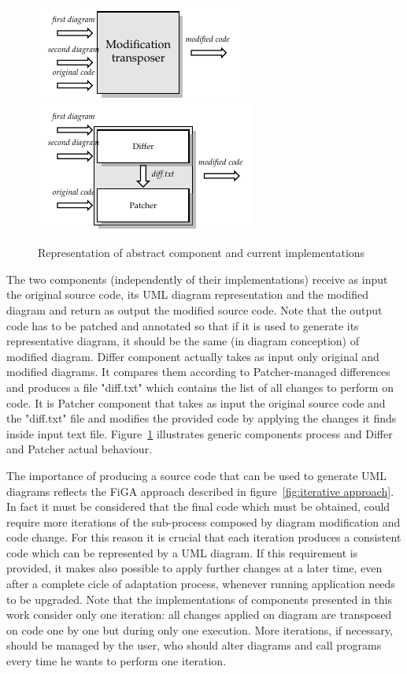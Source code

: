 \begin{figure}[htbp]
   \centering
   \includegraphics{sample/figs/abstractComp.pdf}
   \hspace{1.5cm}
   \includegraphics{sample/figs/concreteComp.pdf}
   \vspace*{5pt}
   \caption{Representation of abstract component and current implementations}\label{generic components i/o}
\end{figure}

The two components (independently of their implementations) receive as input the original source code, its UML diagram representation and the modified diagram and return as output the modified source code. Note that the output code has to be patched and annotated so that if it is used to generate its representative diagram, it should be the same (in diagram conception) of modified diagram.
Differ component actually takes as input only original and modified diagrams. It compares them according to Patcher-managed differences and produces a file "diff.txt" which contains the list of all changes to perform on code. It is Patcher component that takes as input the original source code and the "diff.txt" file and modifies the provided code by applying the changes it finds inside input text file.
Figure~\ref{generic components i/o} illustrates generic components process and Differ and Patcher actual behaviour.

The importance of producing a source code that can be used to generate UML diagrams reflects the FiGA approach described in figure~\ref{fig:iterative approach}. In fact it must be considered that the final code which must be obtained, could require more iterations of the sub-process composed by diagram modification and code change. For this reason it is crucial that each iteration produces a consistent code which can be represented by a UML diagram.
If this requirement is provided, it makes also possible to apply further changes at a later time, even after a complete cicle of adaptation process, whenever running application needs to be upgraded.
Note that the implementations of components presented in this work consider only one iteration: all changes applied on diagram are transposed on code one by one but during only one execution. More iterations, if necessary, should be managed by the user, who should alter diagrams and call programs every time he wants to perform one iteration.

